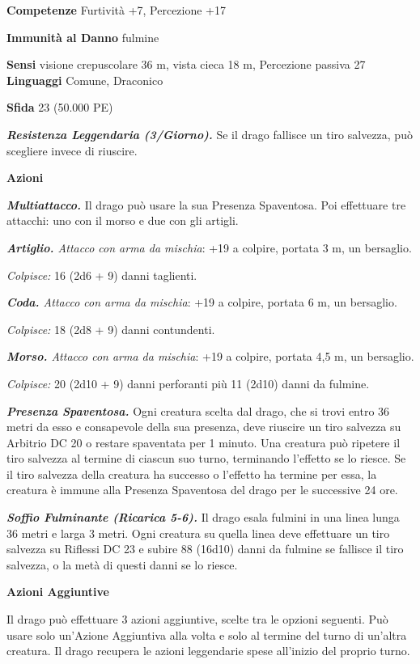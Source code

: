 \begin{multicols}{2}
\textbf{Competenze} Furtività +7, Percezione +17

\textbf{Immunità al Danno} fulmine

\textbf{Sensi} visione crepuscolare 36 m, vista cieca 18 m, Percezione passiva
27 \textbf{Linguaggi} Comune, Draconico

\textbf{Sfida} 23 (50.000 PE)

\emph{\textbf{Resistenza Leggendaria (3/Giorno).}} Se il drago fallisce
un tiro salvezza, può scegliere invece di riuscire.

\textbf{Azioni}

\emph{\textbf{Multiattacco.}} Il drago può usare la sua Presenza
Spaventosa. Poi effettuare tre attacchi: uno con il morso e due con gli
artigli.

\emph{\textbf{Artiglio.} Attacco con arma da mischia}: +19 a colpire,
portata 3 m, un bersaglio.

\emph{Colpisce:} 16 (2d6 + 9) danni taglienti.

\emph{\textbf{Coda.} Attacco con arma da mischia}: +19 a colpire,
portata 6 m, un bersaglio.

\emph{Colpisce:} 18 (2d8 + 9) danni contundenti.

\emph{\textbf{Morso.} Attacco con arma da mischia}: +19 a colpire,
portata 4,5 m, un bersaglio.

\emph{Colpisce:} 20 (2d10 + 9) danni perforanti più 11 (2d10) danni da
fulmine.

\emph{\textbf{Presenza Spaventosa.}} Ogni creatura scelta dal drago, che
si trovi entro 36 metri da esso e consapevole della sua presenza, deve
riuscire un tiro salvezza su Arbitrio DC 20 o restare spaventata per 1
minuto. Una creatura può ripetere il tiro salvezza al termine di ciascun
suo turno, terminando l'effetto se lo riesce. Se il tiro salvezza della
creatura ha successo o l'effetto ha termine per essa, la creatura è
immune alla Presenza Spaventosa del drago per le successive 24 ore.

\emph{\textbf{Soffio Fulminante (Ricarica 5-6).}} Il drago esala fulmini
in una linea lunga 36 metri e larga 3 metri. Ogni creatura su quella
linea deve effettuare un tiro salvezza su Riflessi DC 23 e subire 88
(16d10) danni da fulmine se fallisce il tiro salvezza, o la metà di
questi danni se lo riesce.

\textbf{Azioni Aggiuntive}

Il drago può effettuare 3 azioni aggiuntive, scelte tra le opzioni
seguenti. Può usare solo un'Azione Aggiuntiva alla volta e solo al
termine del turno di un'altra creatura. Il drago recupera le azioni
leggendarie spese all'inizio del proprio turno.


\end{multicols}
